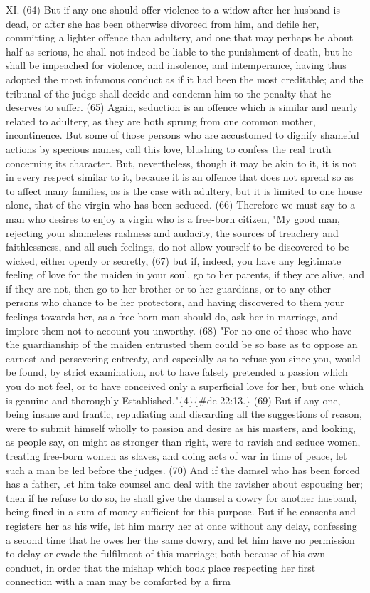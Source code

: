 \documentclass[11pt]{article}
\begin{document}
\begin{quoe}
XI. (64) But if any one should offer violence to a widow after her husband is dead, or after she has been otherwise divorced from him, and defile her, committing a lighter offence than adultery, and one that may perhaps be about half as serious, he shall not indeed be liable to the punishment of death, but he shall be impeached for violence, and insolence, and intemperance, having thus adopted the most infamous conduct as if it had been the most creditable; and the tribunal of the judge shall decide and condemn him to the penalty that he deserves to suffer. (65) Again, seduction is an offence which is similar and nearly related to adultery, as they are both sprung from one common mother, incontinence. But some of those persons who are accustomed to dignify shameful actions by specious names, call this love, blushing to confess the real truth concerning its character. But, nevertheless, though it may be akin to it, it is not in every respect similar to it, because it is an offence that does not spread so as to affect many families, as is the case with adultery, but it is limited to one house alone, that of the virgin who has been seduced. (66) Therefore we must say to a man who desires to enjoy a virgin who is a free-born citizen, "My good man, rejecting your shameless rashness and audacity, the sources of treachery and faithlessness, and all such feelings, do not allow yourself to be discovered to be wicked, either openly or secretly, (67) but if, indeed, you have any legitimate feeling of love for the maiden in your soul, go to her parents, if they are alive, and if they are not, then go to her brother or to her guardians, or to any other persons who chance to be her protectors, and having discovered to them your feelings towards her, as a free-born man should do, ask her in marriage, and implore them not to account you unworthy. (68) "For no one of those who have the guardianship of the maiden entrusted them could be so base as to oppose an earnest and persevering entreaty, and especially as to refuse you since you, would be found, by strict examination, not to have falsely pretended a passion which you do not feel, or to have conceived only a superficial love for her, but one which is genuine and thoroughly Established."\{4\}\{\#de 22:13.\} (69) But if any one, being insane and frantic, repudiating and discarding all the suggestions of reason, were to submit himself wholly to passion and desire as his masters, and looking, as people say, on might as stronger than right, were to ravish and seduce women, treating free-born women as slaves, and doing acts of war in time of peace, let such a man be led before the judges. (70) And if the damsel who has been forced has a father, let him take counsel and deal with the ravisher about espousing her; then if he refuse to do so, he shall give the damsel a dowry for another husband, being fined in a sum of money sufficient for this purpose. But if he consents and registers her as his wife, let him marry her at once without any delay, confessing a second time that he owes her the same dowry, and let him have no permission to delay or evade the fulfilment of this marriage; both because of his own conduct, in order that the mishap which took place respecting her first connection with a man may be comforted by a firm 
\end{quoe}
\end{document}
